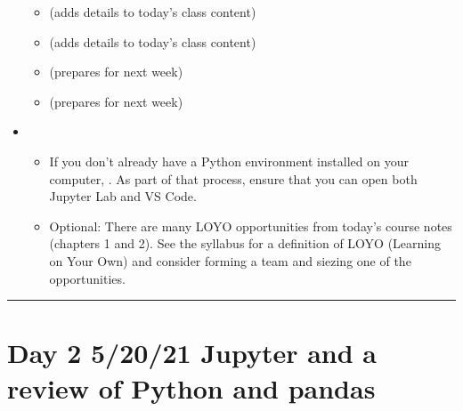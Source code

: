\documentclass[letterpaper,10pt,english]{jupyterBook}
\begin{document}
\begin{itemize}
\begin{itemize}
\item {} 
\sphinxAtStartPar
{\hyperref[\detokenize{chapter-1-intro-to-data-science::doc}]{}} (adds details to today’s class content)

\item {} 
\sphinxAtStartPar
{\hyperref[\detokenize{chapter-2-mathematical-foundations::doc}]{}} (adds details to today’s class content)

\item {} 
\sphinxAtStartPar
{\hyperref[\detokenize{chapter-3-jupyter::doc}]{}} (prepares for next week)

\item {} 
\sphinxAtStartPar
{\hyperref[\detokenize{chapter-4-review-of-python-and-pandas::doc}]{}} (prepares for next week)

\end{itemize}

\item {} 
\sphinxAtStartPar
{}
\begin{itemize}
\item {} 
\sphinxAtStartPar
If you don’t already have a Python environment installed on your computer, {\hyperref[\detokenize{anaconda-installation::doc}]{}}.  As part of that process, ensure that you can open both Jupyter Lab and VS Code.

\item {} 
\sphinxAtStartPar
Optional: There are many LOYO opportunities from today’s course notes (chapters 1 and 2).  See the syllabus for a definition of LOYO (Learning on Your Own) and consider forming a team and siezing one of the opportunities.

\end{itemize}

\end{itemize}


\bigskip\hrule\bigskip



\section{Day 2 \sphinxhyphen{} 5/20/21 \sphinxhyphen{} Jupyter and a review of Python and pandas}
\label{\detokenize{course-schedule:day-2-5-20-21-jupyter-and-a-review-of-python-and-pandas}}
\end{document}
